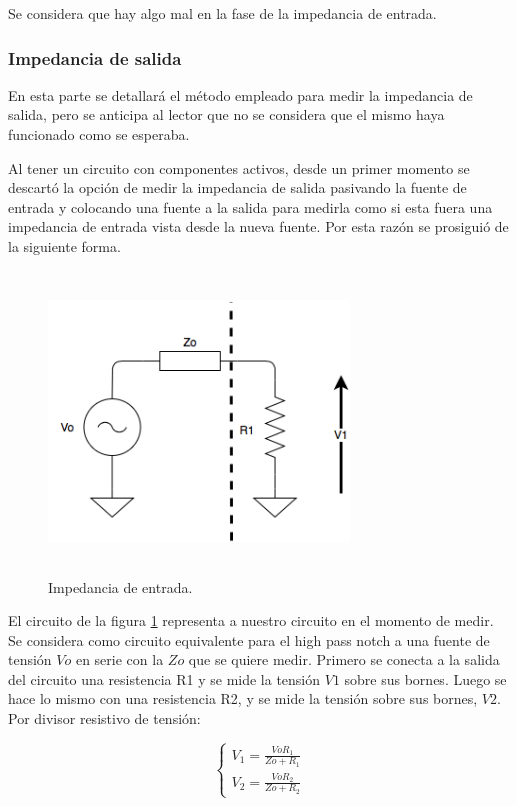 Se considera que hay algo mal en la fase de la impedancia de entrada.

\subsubsection{Impedancia de salida}

En esta parte se detallar\'a el m\'etodo empleado para medir la impedancia de salida, pero se anticipa al lector que no se considera que el mismo haya funcionado como se esperaba. 

Al tener un circuito con componentes activos, desde un primer momento se descart\'o la opci\'on de medir la impedancia de salida pasivando la fuente de entrada y colocando una fuente a la salida para medirla como si esta fuera una impedancia de entrada vista desde la nueva fuente. Por esta raz\'on se prosigui\'o de la siguiente forma.

\begin{figure}[H] %
	\centering
	\includegraphics[width=8cm,height=8cm,keepaspectratio]{../EJ1/00GRAFICOS/zout.png}
	\caption{Impedancia de entrada.}
	\label{zout}
\end{figure}

El circuito de la figura \ref{zout} representa a nuestro circuito en el momento de medir. Se considera como circuito equivalente para el high pass notch a una fuente de tensi\'on $Vo$ en serie con la $Zo$ que se quiere medir. Primero se conecta a la salida del circuito una resistencia R1 y se mide la tensi\'on $V1$ sobre sus bornes. Luego se hace lo mismo con una resistencia R2, y se mide la tensi\'on sobre sus bornes, $V2$. Por divisor resistivo de tensi\'on:

\begin{equation}
\begin{cases}
V_1 = \frac{Vo R_1}{Zo + R_1}\\
V_2 = \frac{Vo R_2}{Zo + R_2}
\end{cases}
\label{v1v2}
\end{equation}

